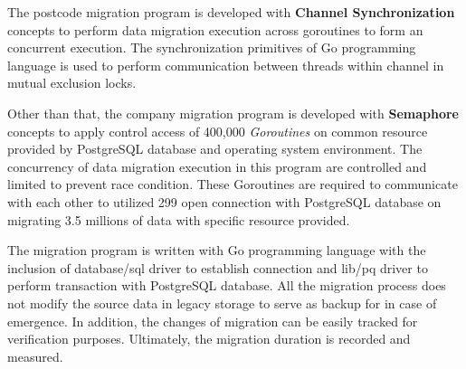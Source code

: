 The postcode migration program is developed with \textbf{Channel Synchronization} concepts to perform data migration execution across goroutines to form an concurrent execution. The synchronization primitives of Go programming language is used to perform communication between threads within channel in mutual exclusion locks.

Other than that, the company migration program is developed with \textbf{Semaphore} concepts to apply control access of 400,000 \textit{Goroutines} on common resource provided by PostgreSQL database and operating system environment. The concurrency of data migration execution in this program are controlled and limited to prevent race condition. These Goroutines are required to communicate with each other to utilized 299 open connection with PostgreSQL database on migrating 3.5 millions of data with specific resource provided. 

The migration program is written with Go programming language with the inclusion of database/sql driver to establish connection and lib/pq driver to perform transaction with PostgreSQL database. All the migration process does not modify the source data in legacy storage to serve as backup for in case of emergence. In addition, the changes of migration can be easily tracked for verification purposes. Ultimately, the migration duration is recorded and measured.  


